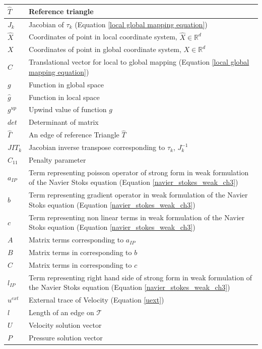 \documentclass[a4paper,openany]{book}
\begin{document}
\begin{longtable}{| p{} | p{} |}
\hline
$\hat{T}$ & Reference triangle\\
\hline
$J_k$ & Jacobian of $\tau_k$ (Equation \ref{local global mapping equation})\\
\hline
$\hat{X}$ & Coordinates of point in local coordinate system, $\hat{X} \in \mathbb{R}^d$\\
\hline
$X$ & Coordinates of point in global coordinate system, $X \in \mathbb{R}^d$\\
\hline
$C$ & Translational vector for local to global mapping (Equation \ref{local global mapping equation})\\
\hline
$g$ & Function in global space \\
\hline
$\hat{g}$ & Function in local space \\
\hline
$g^{up}$ & Upwind value of function $g$\\
\hline
$det$ & Determinant of matrix \\
\hline
$\hat{\Gamma}$ & An edge of reference Triangle $\hat{T}$\\
\hline
$JIT_k$ & Jacobian inverse transpose corresponding to $\tau_k$, $J_k^{-1}$\\
\hline
$C_{11}$ & Penalty parameter \\
\hline
$a_{IP}$ & Term representing poisson operator of strong form in weak formulation of the Navier Stoks equation (Equation \eqref{navier_stokes_weak_ch3}) \\
\hline
$b$ & Term representing gradient operator in weak formulation of the Navier Stoks equation (Equation \eqref{navier_stokes_weak_ch3})\\
\hline
$c$ & Term representing non linear terms in weak formulation of the Navier Stoks equation (Equation \eqref{navier_stokes_weak_ch3})\\
\hline
$A$ & Matrix terms corresponding to $a_{IP}$\\
\hline
$B$ & Matrix terms in corresponding to $b$\\
\hline
$C$ & Matrix terms in corresponding to $c$\\
\hline
$l_{IP}$ & Term representing right hand side of strong form in weak formulation of the Navier Stoks equation (Equation \eqref{navier_stokes_weak_ch3}) \\
\hline
$u^{ext}$ & External trace of Velocity (Equation \ref{uext})\\
\hline
$l$ & Length of an edge on $\mathcal{T}$\\
\hline
$U$ & Velocity solution vector \\
\hline
$P$ & Pressure solution vector\\

\end{longtable}
\end{document}
